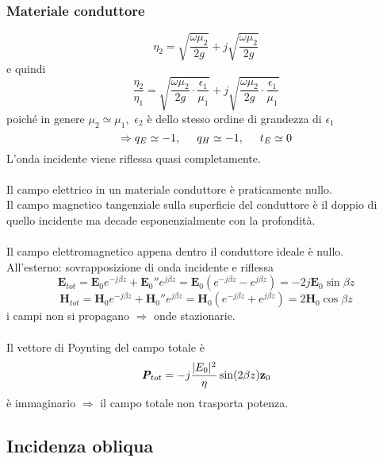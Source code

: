 \documentclass[a4paper]{article}
\begin{document}
\subsubsection*{Materiale conduttore}
\begin{equation*}
\eta_2=\sqrt{\frac{\omega\mu_2}{2g}}+j\sqrt{\frac{\omega\mu_2}{2g}}
\end{equation*}
e quindi
\begin{equation*}
\frac{\eta_2}{\eta_1}=\sqrt{\frac{\omega\mu_2}{2g}\cdot\frac{\epsilon_1}{\mu_1}}+j\sqrt{\frac{\omega\mu_2}{2g}\cdot\frac{\epsilon_1}{\mu_1}}
\end{equation*}
poiché in genere $\mu_2\simeq\mu_1,\,\,\epsilon_2$ è dello stesso ordine di grandezza di $\epsilon_1$
\begin{equation*}
\Rightarrow q_E\simeq-1,\hspace{5mm}q_H\simeq-1,\hspace{5mm}t_E\simeq 0
\end{equation*}
L'onda incidente viene riflessa quasi completamente.\\\\
Il campo elettrico in un materiale conduttore è praticamente nullo.\\
Il campo magnetico tangenziale sulla superficie del conduttore è il doppio di quello incidente ma decade esponenzialmente con la profondità.\\\\
Il campo elettromagnetico appena dentro il conduttore ideale è nullo.\\
All'esterno: sovrapposizione di onda incidente e riflessa
\begin{equation*}
\textbf{E}_{tot}=\textbf{E}_0e^{-j\beta z}+\textbf{E}_0''e^{j\beta z}=\textbf{E}_0(e^{-j\beta z}-e^{j\beta z})=-2j\textbf{E}_0\sin\beta z
\end{equation*}
\begin{equation*}
\textbf{H}_{tot}=\textbf{H}_0e^{-j\beta z}+\textbf{H}_0''e^{j\beta z}=\textbf{H}_0(e^{-j\beta z}+e^{j\beta z})=2\textbf{H}_0\cos\beta z
\end{equation*}
i campi non si propagano $\Rightarrow$ onde stazionarie.\\\\
Il vettore di Poynting del campo totale è
\begin{equation*}
\emph{\textbf{P}}_{tot}=-j\frac{|E_0|^2}{\eta}\sin(2\beta z)\textbf{z}_0
\end{equation*}
è immaginario $\Rightarrow$ il campo totale non trasporta potenza.
\subsection*{Incidenza obliqua}
\end{document}
